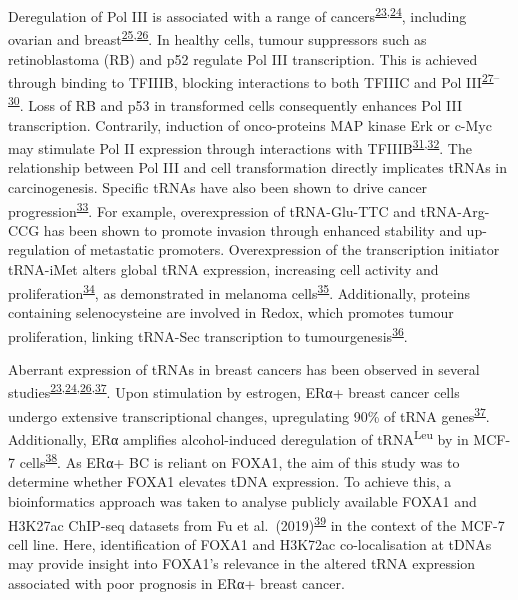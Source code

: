 \documentclass[
  12pt,
]{article}
\begin{document}
Deregulation of Pol III is associated with a range of cancers\textsuperscript{\protect\hyperlink{ref-Zhang2018}{23},\protect\hyperlink{ref-Pavon-Eternod2009}{24}}, including ovarian and breast\textsuperscript{\protect\hyperlink{ref-Winter2000}{25},\protect\hyperlink{ref-Krishnan2016}{26}}.
In healthy cells, tumour suppressors such as retinoblastoma (RB) and p52 regulate Pol III transcription.
This is achieved through binding to TFIIIB, blocking interactions to both TFIIIC and Pol III\textsuperscript{\protect\hyperlink{ref-White1996}{27}--\protect\hyperlink{ref-Crighton2003}{30}}.
Loss of RB and p53 in transformed cells consequently enhances Pol III transcription.
Contrarily, induction of onco-proteins MAP kinase Erk or c-Myc may stimulate Pol II expression through interactions with TFIIIB\textsuperscript{\protect\hyperlink{ref-Gomez-Roman2003}{31},\protect\hyperlink{ref-Felton-Edkins2003}{32}}.
The relationship between Pol III and cell transformation directly implicates tRNAs in carcinogenesis.
Specific tRNAs have also been shown to drive cancer progression\textsuperscript{\protect\hyperlink{ref-Goodarzi2016}{33}}.
For example, overexpression of tRNA-Glu-TTC and tRNA-Arg-CCG has been shown to promote invasion through enhanced stability and up-regulation of metastatic promoters.
Overexpression of the transcription initiator tRNA-iMet alters global tRNA expression, increasing cell activity and proliferation\textsuperscript{\protect\hyperlink{ref-Pavon-Eternod2013}{34}}, as demonstrated in melanoma cells\textsuperscript{\protect\hyperlink{ref-Birch2016}{35}}.
Additionally, proteins containing selenocysteine are involved in Redox, which promotes tumour proliferation, linking tRNA-Sec transcription to tumourgenesis\textsuperscript{\protect\hyperlink{ref-Sangha2022}{36}}.

Aberrant expression of tRNAs in breast cancers has been observed in several studies\textsuperscript{\protect\hyperlink{ref-Zhang2018}{23},\protect\hyperlink{ref-Pavon-Eternod2009}{24},\protect\hyperlink{ref-Krishnan2016}{26},\protect\hyperlink{ref-Hah2011}{37}}.
Upon stimulation by estrogen, ERα+ breast cancer cells undergo extensive transcriptional changes, upregulating 90\% of tRNA genes\textsuperscript{\protect\hyperlink{ref-Hah2011}{37}}.
Additionally, ERα amplifies alcohol-induced deregulation of tRNA\textsuperscript{Leu} by in MCF-7 cells\textsuperscript{\protect\hyperlink{ref-zhong2014}{38}}.
As ERα+ BC is reliant on FOXA1, the aim of this study was to determine whether FOXA1 elevates tDNA expression.
To achieve this, a bioinformatics approach was taken to analyse publicly available FOXA1 and H3K27ac ChIP-seq datasets from Fu et al.~(2019)\textsuperscript{\protect\hyperlink{ref-fu2019}{39}} in the context of the MCF-7 cell line.
Here, identification of FOXA1 and H3K72ac co-localisation at tDNAs may provide insight into FOXA1's relevance in the altered tRNA expression associated with poor prognosis in ERα+ breast cancer.
\end{document}

